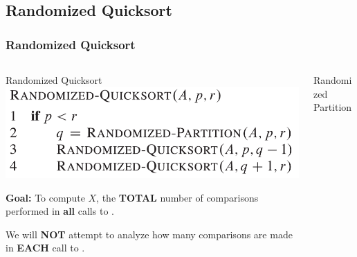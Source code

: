 \documentclass[UTF8,11pt,handout]{beamer}
\begin{document}
\subsection{Randomized Quicksort}
\begin{frame}[t]
	\frametitle{Randomized Quicksort}
	\begin{columns}
	
	\begin{column}[T, onlytextwidth]{.5\textwidth}
	\begin{block}{Randomized Quicksort}
		\includegraphics[height=.23\textheight]{figs/randomized-quicksort.png}
	\end{block}
	\begin{block}{\textbf{\color{red}Goal:}}
		To compute $X$, the \textbf{\color{blue}TOTAL} number of comparisons performed in \textbf{all} calls to . 
		
		We will \textbf{NOT} attempt to analyze how many comparisons are made in  \textbf{\color{blue}EACH} call to .
	\end{block}
	\end{column}
	\begin{column}[T, onlytextwidth]{.4\textwidth}
	\begin{block}{Randomized Partition}
	
\end{block}
\end{column}
\end{columns}
\end{frame}
\end{document}

